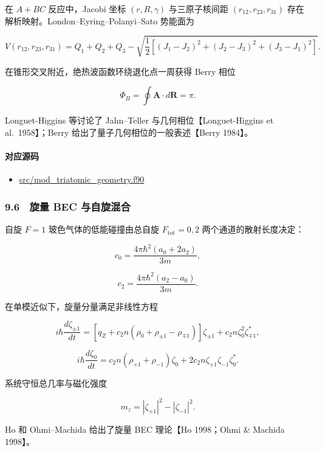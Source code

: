 \documentclass[
]{ctexbook}
\providecommand{\tightlist}{%
  \setlength{\itemsep}{0pt}\setlength{\parskip}{0pt}}
\begin{document}
在 \(A+BC\) 反应中，Jacobi 坐标 \((r,R,\gamma)\) 与三原子核间距
\((r_{12},r_{23},r_{31})\) 存在解析映射。London--Eyring--Polanyi--Sato
势能面为

\[
V(r_{12},r_{23},r_{31})
=
Q_1+Q_2+Q_3
-
\sqrt{
\frac12
\left[
(J_1-J_2)^2
+
(J_2-J_3)^2
+
(J_3-J_1)^2
\right]
}.
\]

在锥形交叉附近，绝热波函数环绕退化点一周获得 Berry 相位

\[
\Phi_B=\oint\mathbf A\cdot d\mathbf R=\pi.
\]

Longuet-Higgins 等讨论了 Jahn--Teller 与几何相位【Longuet-Higgins et
al.~1958】；Berry 给出了量子几何相位的一般表述【Berry 1984】。

\hypertarget{ux5bf9ux5e94ux6e90ux7801-43}{%
\paragraph{对应源码}\label{ux5bf9ux5e94ux6e90ux7801-43}}

\begin{itemize}
\tightlist
\item
  \href{https://github.com/l1Ha/QuantumGeneralModule/blob/main/src/mod_triatomic_geometry.f90}{src/mod\_triatomic\_geometry.f90}
\end{itemize}

\hypertarget{ux65cbux91cf-bec-ux4e0eux81eaux65cbux6df7ux5408}{%
\subsubsection{9.6　旋量 BEC
与自旋混合}\label{ux65cbux91cf-bec-ux4e0eux81eaux65cbux6df7ux5408}}

自旋 \(F=1\) 玻色气体的低能碰撞由总自旋 \(F_{\mathrm{tot}}=0,2\)
两个通道的散射长度决定：

\[
c_0=\frac{4\pi\hbar^2(a_0+2a_2)}{3m},
\]

\[
c_2=\frac{4\pi\hbar^2(a_2-a_0)}{3m}.
\]

在单模近似下，旋量分量满足非线性方程

\[
i\hbar\frac{d\zeta_{\pm1}}{dt}
=
\left[
q_Z+c_2n(\rho_0+\rho_{\pm1}-\rho_{\mp1})
\right]\zeta_{\pm1}
+
c_2n\zeta_0^2\zeta_{\mp1}^{*},
\]

\[
i\hbar\frac{d\zeta_0}{dt}
=
c_2n(\rho_{+1}+\rho_{-1})\zeta_0
+
2c_2n\zeta_{+1}\zeta_{-1}\zeta_0^{*}.
\]

系统守恒总几率与磁化强度

\[
m_z=|\zeta_{+1}|^2-|\zeta_{-1}|^2.
\]

Ho 和 Ohmi--Machida 给出了旋量 BEC 理论【Ho 1998；Ohmi \& Machida
1998】。
\end{document}
